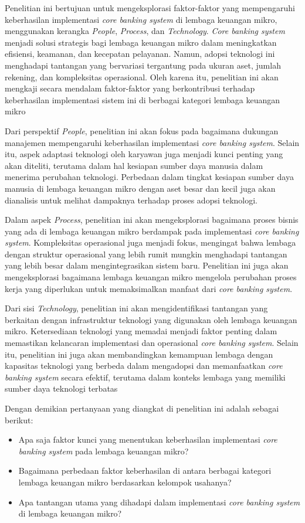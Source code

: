 \documentclass[journal,article,submit,pdftex,moreauthors]{Definitions/mdpi}
\begin{document}
Penelitian ini bertujuan untuk mengeksplorasi faktor-faktor yang mempengaruhi keberhasilan implementasi \textit{core banking system} di lembaga keuangan mikro, menggunakan kerangka \textit{People}, \textit{Process}, dan \textit{Technology}. \textit{Core banking system} menjadi solusi strategis bagi lembaga keuangan mikro dalam meningkatkan efisiensi, keamanan, dan kecepatan pelayanan. Namun, adopsi teknologi ini menghadapi tantangan yang bervariasi tergantung pada ukuran aset, jumlah rekening, dan kompleksitas operasional. Oleh karena itu, penelitian ini akan mengkaji secara mendalam faktor-faktor yang berkontribusi terhadap keberhasilan implementasi sistem ini di berbagai kategori lembaga keuangan mikro

Dari perspektif \textit{People}, penelitian ini akan fokus pada bagaimana dukungan manajemen mempengaruhi keberhasilan implementasi \textit{core banking system}. Selain itu, aspek adaptasi teknologi oleh karyawan juga menjadi kunci penting yang akan diteliti, terutama dalam hal kesiapan sumber daya manusia dalam menerima perubahan teknologi. Perbedaan dalam tingkat kesiapan sumber daya manusia di lembaga keuangan mikro dengan aset besar dan kecil juga akan dianalisis untuk melihat dampaknya terhadap proses adopsi teknologi.

Dalam aspek \textit{Process}, penelitian ini akan mengeksplorasi bagaimana proses bisnis yang ada di lembaga keuangan mikro berdampak pada implementasi \textit{core banking system}. Kompleksitas operasional juga menjadi fokus, mengingat bahwa lembaga dengan struktur operasional yang lebih rumit mungkin menghadapi tantangan yang lebih besar dalam mengintegrasikan sistem baru. Penelitian ini juga akan mengeksplorasi bagaimana lembaga keuangan mikro mengelola perubahan proses kerja yang diperlukan untuk memaksimalkan manfaat dari \textit{core banking system}.

Dari sisi \textit{Technology}, penelitian ini akan mengidentifikasi tantangan yang berkaitan dengan infrastruktur teknologi yang digunakan oleh lembaga keuangan mikro. Ketersediaan teknologi yang memadai menjadi faktor penting dalam memastikan kelancaran implementasi dan operasional \textit{core banking system}. Selain itu, penelitian ini juga akan membandingkan kemampuan lembaga dengan kapasitas teknologi yang berbeda dalam mengadopsi dan memanfaatkan \textit{core banking system} secara efektif, terutama dalam konteks lembaga yang memiliki sumber daya teknologi terbatas

Dengan demikian pertanyaan yang diangkat di penelitian ini adalah sebagai berikut:
\begin{itemize}
    \item Apa saja faktor kunci yang menentukan keberhasilan implementasi \textit{core banking system} pada lembaga keuangan mikro?
    \item Bagaimana perbedaan faktor keberhasilan di antara berbagai kategori lembaga keuangan mikro berdasarkan kelompok usahanya?
    \item Apa tantangan utama yang dihadapi dalam implementasi \textit{core banking system} di lembaga keuangan mikro?
\end{itemize}
\end{document}
